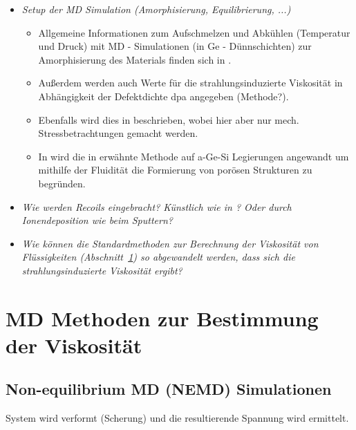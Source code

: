 \documentclass[a4paper, 10pt, 
               numbers=noenddot, toc=graduated,
               headsepline=true, footsepline=true,
               twoside=false, titlepage=true, 
               bibliography=totoc]{scrartcl}
\newcommand{\refsec}[1]  {Abschnitt~\ref{#1}}
\begin{document}
\begin{itemize}

   \item \textit{Setup der MD Simulation (Amorphisierung, Equilibrierung, ...)}
   
	\begin{itemize}
	   \item Allgemeine Informationen zum Aufschmelzen und Abkühlen (Temperatur und Druck) mit MD - Simulationen (in Ge - Dünnschichten) zur Amorphisierung des Materials finden sich in \cite{Mayr2005}. 
	   
	   \item Außerdem werden auch Werte für die strahlungsinduzierte Viskosität in Abhängigkeit der Defektdichte dpa angegeben (Methode?). 

	   \item Ebenfalls wird dies in \cite{Edler2007} beschrieben, wobei hier aber nur mech. Stressbetrachtungen gemacht werden. 
	   
	   \item In \cite{Lehnert2017} wird die in \cite{Mayr2003} erwähnte Methode auf a-Ge-Si Legierungen angewandt um mithilfe der Fluidität die Formierung von porösen Strukturen zu begründen.
	   
	\end{itemize}	   
   
   \item \textit{Wie werden Recoils eingebracht? Künstlich wie in \cite{Mayr2003}? Oder durch Ionendeposition wie beim Sputtern?}
   \item \textit{Wie können die Standardmethoden zur Berechnung der Viskosität von Flüssigkeiten (\refsec{sec:visc}) so abgewandelt werden, dass sich die strahlungsinduzierte Viskosität ergibt?}
   
 

\end{itemize}


\section{MD Methoden zur Bestimmung der Viskosität}\label{sec:visc}

\subsection{Non-equilibrium MD (NEMD) Simulationen}

System wird verformt (Scherung) und die resultierende Spannung wird ermittelt. 
\end{document}
